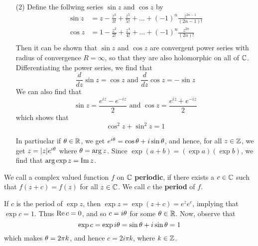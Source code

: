 \begin{example}
\begin{enumerate}
        \item[(2)] Define the follwing series $\sin{z}$ and $\cos{z}$ by
            \begin{align*}
                \sin{z} &= z-\frac{z^3}{3!}+\frac{z^5}{5!}+\dots+
                            (-1)^n\frac{z^{2n-1}}{(2n-1)!}    \\
                \cos{z} &=  1-\frac{z^2}{2!}+\frac{z^4}{4!}+\dots+
                            (-1)^n\frac{z^{2n}}{(2n)!}    \\
            \end{align*}
            Then it can be shown that $\sin{z}$ and $\cos{z}$ are convergent
            power series with radius of convergence $R=\infty$, so that they
            are also holomorphic on all of  $\mathbb{C}$. Differentiating the power series,
            we find that
            \begin{equation*}
                \frac{d}{dz}{\sin{z}}=\cos{z} \text{ and }
                \frac{d}{dz}{\cos{z}}=-\sin{z}
            \end{equation*}
            We can also find that
            \begin{equation*}
                \sin{z}=\frac{e^{iz}-e^{-iz}}{2} \text{ and }
                \cos{z}=\frac{e^{iz}+e^{-iz}}{2}
            \end{equation*}
            which shows that
            \begin{equation*}
                \cos^2{z}+\sin^2{z}=1
            \end{equation*}

            In partiuclar if $\theta \in \mathbb{R}$, we get
            $e^{i\theta}=\cos{\theta}+i\sin{\theta}$, and hence, for all $z \in \mathbb{Z}$, we
            get $z=|z|e^{i\theta}$ where $\theta=\arg{z}$. Since
            $\exp{(a+b)}=(\exp{a})(\exp{b})$, we find that
            $\arg{\exp{z}}=\operatorname{Im}{z}$.
    \end{enumerate}
\end{example}

\begin{definition}
    We call a complex valued function $f$ on $\mathbb{C}$ \textbf{periodic}, if there
    exists a $c \in \mathbb{C}$ such that  $f(z+c)=f(z)$ for all $z \in \mathbb{C}$. We call $c$
    the \textbf{period} of $f$.
\end{definition}

\begin{example}\label{example_3.5}
    If $c$ is the period of  $\exp{z}$, then $\exp{z}=\exp{(z+c)}=e^ze^c$,
    implying that $\exp{c}=1$. Thus $\operatorname{Re}{c}=0$, and so $c=i\theta$ for some  $\theta
    \in \mathbb{R}$. Now, observe that
    \begin{equation*}
        \exp{c}=\exp{i\theta}=\sin{\theta}+i\sin{\theta}=1
    \end{equation*}
    which makes $\theta=2\pi k$, and hence $c=2i\pi k$, where $k \in \mathbb{Z}$.
\end{example}

